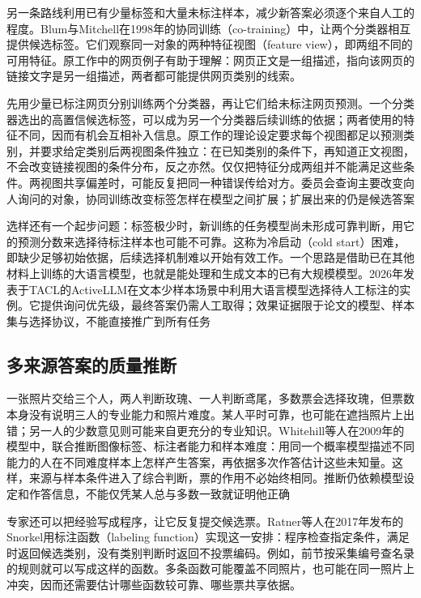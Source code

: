 另一条路线利用已有少量标签和大量未标注样本，减少新答案必须逐个来自人工的程度。Blum与Mitchell在1998年的协同训练（co-training）中，让两个分类器相互提供候选标签。它们观察同一对象的两种特征视图（feature view），即两组不同的可用特征。原工作中的网页例子有助于理解：网页正文是一组描述，指向该网页的链接文字是另一组描述，两者都可能提供网页类别的线索。

先用少量已标注网页分别训练两个分类器，再让它们给未标注网页预测。一个分类器选出的高置信候选标签，可以成为另一个分类器后续训练的依据；两者使用的特征不同，因而有机会互相补入信息。原工作的理论设定要求每个视图都足以预测类别，并要求给定类别后两视图条件独立：在已知类别的条件下，再知道正文视图，不会改变链接视图的条件分布，反之亦然。仅仅把特征分成两组并不能满足这些条件。两视图共享偏差时，可能反复把同一种错误传给对方。委员会查询主要改变向人询问的对象，协同训练改变标签怎样在模型之间扩展；扩展出来的仍是候选答案

选样还有一个起步问题：标签极少时，新训练的任务模型尚未形成可靠判断，用它的预测分数来选择待标注样本也可能不可靠。这称为冷启动（cold start）困难，即缺少足够初始依据，后续选择机制难以开始有效工作。一个思路是借助已在其他材料上训练的大语言模型，也就是能处理和生成文本的已有大规模模型。2026年发表于TACL的ActiveLLM在文本少样本场景中利用大语言模型选择待人工标注的实例。它提供询问优先级，最终答案仍需人工取得；效果证据限于论文的模型、样本集与选择协议，不能直接推广到所有任务

\subsection{多来源答案的质量推断}
\label{sec:knowledge-acquisition-history-source-quality}

一张照片交给三个人，两人判断玫瑰、一人判断鸢尾，多数票会选择玫瑰，但票数本身没有说明三人的专业能力和照片难度。某人平时可靠，也可能在遮挡照片上出错；另一人的少数意见则可能来自更充分的专业知识。Whitehill等人在2009年的模型中，联合推断图像标签、标注者能力和样本难度：用同一个概率模型描述不同能力的人在不同难度样本上怎样产生答案，再依据多次作答估计这些未知量。这样，来源与样本条件进入了综合判断，票的作用不必始终相同。推断仍依赖模型设定和作答信息，不能仅凭某人总与多数一致就证明他正确

专家还可以把经验写成程序，让它反复提交候选票。Ratner等人在2017年发布的Snorkel用标注函数（labeling function）实现这一安排：程序检查指定条件，满足时返回候选类别，没有类别判断时返回不投票编码。例如，前节按采集编号查名录的规则就可以写成这样的函数。多条函数可能覆盖不同照片，也可能在同一照片上冲突，因而还需要估计哪些函数较可靠、哪些票共享依据。

